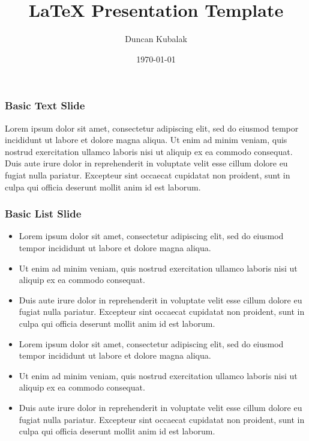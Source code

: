 \documentclass{beamer}
\title{LaTeX Presentation Template}
\author{Duncan Kubalak}
\date{\today}
\begin{document}
	\frame{\titlepage}
	
	\begin{frame}
		\frametitle{Basic Text Slide}
		Lorem ipsum dolor sit amet, consectetur adipiscing elit, sed do eiusmod tempor incididunt ut labore et dolore magna aliqua. Ut enim ad minim veniam, quis nostrud exercitation ullamco laboris nisi ut aliquip ex ea commodo consequat. Duis aute irure dolor in reprehenderit in voluptate velit esse cillum dolore eu fugiat nulla pariatur. Excepteur sint occaecat cupidatat non proident, sunt in culpa qui officia deserunt mollit anim id est laborum.
	\end{frame}

	\begin{frame}
		\frametitle{Basic List Slide}
		\begin{itemize}
			\item{Lorem ipsum dolor sit amet, consectetur adipiscing elit, sed do eiusmod tempor incididunt ut labore et dolore magna aliqua.}
			\item{Ut enim ad minim veniam, quis nostrud exercitation ullamco laboris nisi ut aliquip ex ea commodo consequat.}
			\item{Duis aute irure dolor in reprehenderit in voluptate velit esse cillum dolore eu fugiat nulla pariatur. Excepteur sint occaecat cupidatat non proident, sunt in culpa qui officia deserunt mollit anim id est laborum.}
			\item{Lorem ipsum dolor sit amet, consectetur adipiscing elit, sed do eiusmod tempor incididunt ut labore et dolore magna aliqua.}
			\item{Ut enim ad minim veniam, quis nostrud exercitation ullamco laboris nisi ut aliquip ex ea commodo consequat.}
			\item{Duis aute irure dolor in reprehenderit in voluptate velit esse cillum dolore eu fugiat nulla pariatur. Excepteur sint occaecat cupidatat non proident, sunt in culpa qui officia deserunt mollit anim id est laborum.}
		\end{itemize}
	\end{frame}
\end{document}
